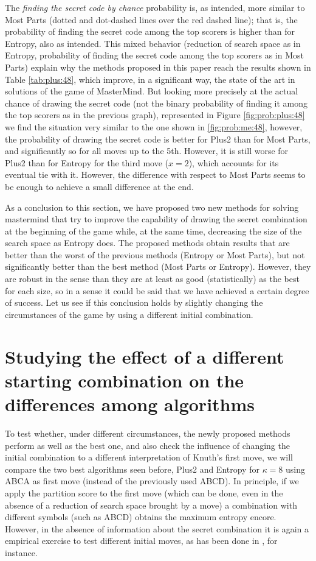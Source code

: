 \documentclass[preprint,12pt]{elsarticle}
\begin{document}
The {\em finding the secret code by chance} probability is, as
intended, more similar to Most Parts (dotted and dot-dashed lines over the
red dashed line); that is, the probability of finding the secret code
among the top scorers is higher than for Entropy, also as
intended. This mixed behavior (reduction of search space as in
Entropy, probability of finding the secret code among the top scorers
as in Most Parts) explain why the methods proposed in this paper reach
the results shown in Table \ref{tab:plus:48}, which improve, in a
significant way, the state of the art in solutions of the game of
MasterMind. But looking more precisely at the actual chance of drawing
the secret code (not the binary probability of finding it among the
top scorers as in the previous graph), represented in Figure
\ref{fig:prob:plus:48} we find the situation very similar to the one
shown in \ref{fig:prob:me:48}, however, the probability of drawing the
secret code is better for Plus2 than for Most Parts, and significantly
so for all moves up to the 5th. However, it is still worse for Plus2
than for Entropy for the third move ($x=2$), which accounts for its
eventual tie with it. However, the difference with respect to Most
Parts seems to be enough to achieve a small difference at the end. 

As a conclusion to this section, we have proposed two new methods for
solving mastermind that try to improve the capability of drawing the
secret combination at the beginning of the game while, at the same
time, decreasing the size of the search space as Entropy does. The
proposed methods obtain results that are better than the worst of the
previous methods (Entropy or Most Parts), but not significantly better
than the best method (Most Parts or Entropy). However, they are robust
in the sense than they are at least as good (statistically) as the
best for each size, so in a sense it could be said that we have
achieved a certain degree of success. Let us see if this conclusion
holds by slightly changing the circumstances of the game by using a
different initial combination. 


\section{Studying the effect of a different starting combination on
  the differences among algorithms} 

To test whether, under different circumstances, the newly proposed
methods perform as well as the best one, and also check the influence
of changing the initial combination to a different interpretation of
Knuth's first move, we will compare the two best algorithms seen
before, Plus2 and Entropy for $\kappa=8$ using ABCA as first move (instead of the
previously used ABCD). In principle, if we apply the partition score
to the first move (which can be done, even in the absence of a
reduction of search space brought by a move) a combination with
different symbols (such as ABCD) obtains the maximum entropy
encore. However, in the absence of information about the secret
combination it is again a empirical exercise to test different initial
moves, as has been done in \cite{Berghman20091880}, for instance. 
\end{document}

